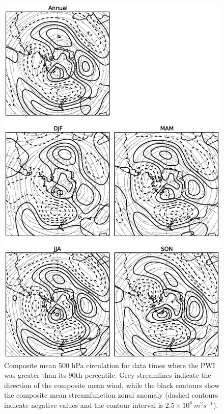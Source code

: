 \begin{figure}
\begin{center}
\includegraphics[width=0.7\columnwidth]{figures/zonalwaves/sf-composite_pwigt90pct_ERAInterim_500hPa_030day-runmean_native-zonal-anom-shextropics15.eps}
\caption[Composite mean 500 hPa circulation for data times where the PWI was greater than its 90th percentile]{\label{fig:pwi_spatial_summary}
Composite mean 500 hPa circulation for data times where the PWI was greater than its 90th percentile. Grey streamlines indicate the direction of the composite mean wind, while the black contours show the composite mean streamfunction zonal anomaly (dashed contours indicate negative values and the contour interval is $2.5 \times 10^6 \: m^2 s^{-1}$).}
\end{center}
\end{figure}

